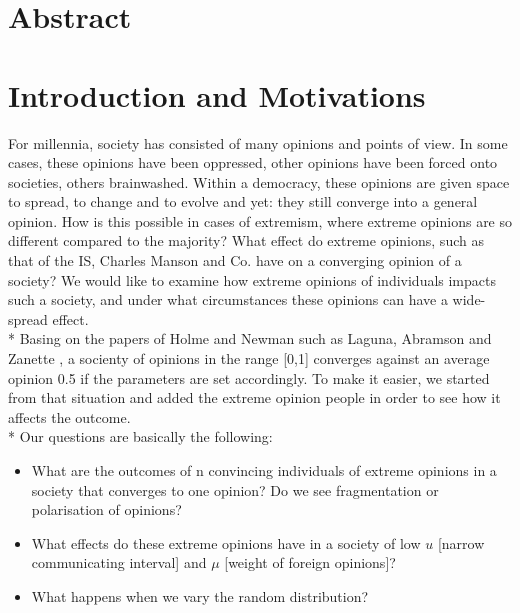 \documentclass[11pt]{article}
\begin{document}

\tableofcontents

\newpage




\section{Abstract}

\section{Introduction and Motivations}
For millennia, society has consisted of many opinions and points of view. In some cases, these opinions have been oppressed, other opinions have been forced onto societies, others brainwashed. Within a democracy, these opinions are given space to spread, to change and to evolve and yet: they still converge into a general opinion. How is this possible in cases of extremism, where extreme opinions are so different compared to the majority? What effect do extreme opinions, such as that of the IS, Charles Manson and Co. have on a converging opinion of a society? We would like to examine how extreme opinions of individuals impacts such a society, and under what circumstances these opinions can have a wide-spread effect. \\*
Basing on the papers of Holme and Newman \cite{Coevolutions} such as Laguna, Abramson and Zanette \cite{Minor}, a socienty of opinions in the range [0,1] converges against an average opinion 0.5 if the parameters are set accordingly. To make it easier, we started from that situation and added the extreme opinion people in order to see how it affects the outcome. \\*
Our questions are basically the following: 
\begin{itemize}
\item What are the outcomes of n convincing individuals of extreme opinions in a society that converges to one opinion? Do we see fragmentation or polarisation of opinions?
\item What effects do these extreme opinions have in a society of low $u$ [narrow communicating interval] and $\mu$ [weight of foreign opinions]?
\item What happens when we vary the random distribution?
\end{itemize}
\end{document}
